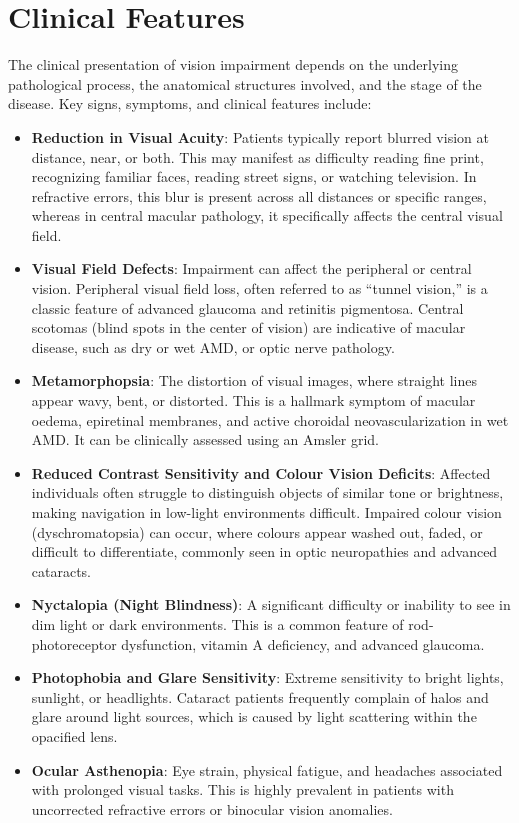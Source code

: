 \section*{Clinical Features}
The clinical presentation of vision impairment depends on the underlying pathological process, the anatomical structures involved, and the stage of the disease. Key signs, symptoms, and clinical features include:
\begin{itemize}
    \item \textbf{Reduction in Visual Acuity}: Patients typically report blurred vision at distance, near, or both. This may manifest as difficulty reading fine print, recognizing familiar faces, reading street signs, or watching television. In refractive errors, this blur is present across all distances or specific ranges, whereas in central macular pathology, it specifically affects the central visual field.
    \item \textbf{Visual Field Defects}: Impairment can affect the peripheral or central vision. Peripheral visual field loss, often referred to as ``tunnel vision,'' is a classic feature of advanced glaucoma and retinitis pigmentosa. Central scotomas (blind spots in the center of vision) are indicative of macular disease, such as dry or wet AMD, or optic nerve pathology.
    \item \textbf{Metamorphopsia}: The distortion of visual images, where straight lines appear wavy, bent, or distorted. This is a hallmark symptom of macular oedema, epiretinal membranes, and active choroidal neovascularization in wet AMD. It can be clinically assessed using an Amsler grid.
    \item \textbf{Reduced Contrast Sensitivity and Colour Vision Deficits}: Affected individuals often struggle to distinguish objects of similar tone or brightness, making navigation in low-light environments difficult. Impaired colour vision (dyschromatopsia) can occur, where colours appear washed out, faded, or difficult to differentiate, commonly seen in optic neuropathies and advanced cataracts.
    \item \textbf{Nyctalopia (Night Blindness)}: A significant difficulty or inability to see in dim light or dark environments. This is a common feature of rod-photoreceptor dysfunction, vitamin A deficiency, and advanced glaucoma.
    \item \textbf{Photophobia and Glare Sensitivity}: Extreme sensitivity to bright lights, sunlight, or headlights. Cataract patients frequently complain of halos and glare around light sources, which is caused by light scattering within the opacified lens.
    \item \textbf{Ocular Asthenopia}: Eye strain, physical fatigue, and headaches associated with prolonged visual tasks. This is highly prevalent in patients with uncorrected refractive errors or binocular vision anomalies.
\end{itemize}

